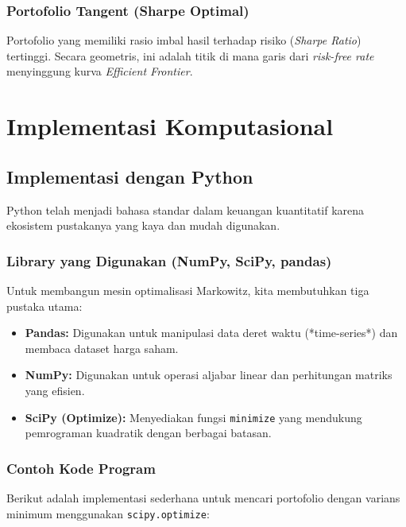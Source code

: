 \documentclass[12pt,a4paper]{book}
\begin{document}
\subsection{Portofolio Tangent (Sharpe Optimal)}
Portofolio yang memiliki rasio imbal hasil terhadap risiko (\textit{Sharpe Ratio}) tertinggi. Secara geometris, ini adalah titik di mana garis dari \textit{risk-free rate} menyinggung kurva \textit{Efficient Frontier}.

\chapter{Implementasi Komputasional}

\section{Implementasi dengan Python}
Python telah menjadi bahasa standar dalam keuangan kuantitatif karena ekosistem pustakanya yang kaya dan mudah digunakan.

\subsection{Library yang Digunakan (NumPy, SciPy, pandas)}
Untuk membangun mesin optimalisasi Markowitz, kita membutuhkan tiga pustaka utama:
\begin{itemize}
    \item \textbf{Pandas:} Digunakan untuk manipulasi data deret waktu (*time-series*) dan membaca dataset harga saham.
    \item \textbf{NumPy:} Digunakan untuk operasi aljabar linear dan perhitungan matriks yang efisien.
    \item \textbf{SciPy (Optimize):} Menyediakan fungsi \texttt{minimize} yang mendukung pemrograman kuadratik dengan berbagai batasan.
\end{itemize}

\subsection{Contoh Kode Program}
Berikut adalah implementasi sederhana untuk mencari portofolio dengan varians minimum menggunakan \texttt{scipy.optimize}:
\end{document}
